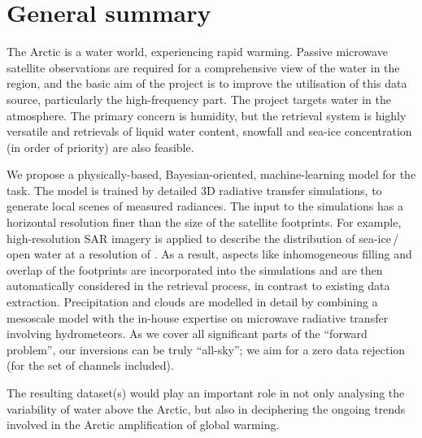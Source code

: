 \documentclass[12pt,oneside,a4paper]{article}
\begin{document}
	
	
	\thispagestyle{empty}
	\vspace*{-10mm}
	\noindent
	\textbf{\Large \LongTitle}




\section{General summary}
%
The Arctic is a water world, experiencing rapid warming. Passive microwave
satellite observations are required for a comprehensive view of the water in
the region, and the basic aim of the project is to improve the utilisation of
this data source, particularly the high-frequency part. The project targets
water in the atmosphere. The primary concern is humidity, but
the retrieval system is highly versatile and retrievals of liquid water
content, snowfall and sea-ice concentration (in order of priority) are also
feasible.

We propose a physically-based, Bayesian-oriented, machine-learning model for
the task. The model is trained by detailed 3D radiative transfer simulations,
to generate local scenes of measured radiances. The input to the simulations
has a horizontal resolution finer than the size of the satellite footprints.
For example, high-resolution SAR imagery is applied to describe the
distribution of sea-ice\,/\,open water at a resolution of . As a result,
aspects like inhomogeneous filling and overlap of the footprints are
incorporated into the simulations and are then automatically considered in the
retrieval process, in contrast to existing data extraction. Precipitation and
clouds are modelled in detail by combining a mesoscale model with the in-house
expertise on microwave radiative transfer involving hydrometeors. As we cover
all significant parts of the ``forward problem'', our inversions can be truly
``all-sky''; we aim for a zero data rejection (for the set of channels
included).

The resulting dataset(s) would play an important role in not only analysing the
variability of water above the Arctic, but also in deciphering the
ongoing trends involved in the Arctic amplification of global warming.
\end{document}
